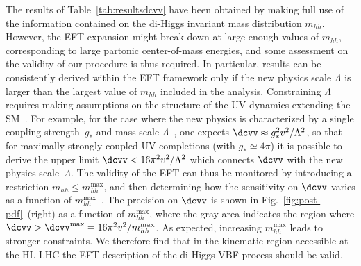 The results of Table~\ref{tab:resultsdcvv}
have been obtained by making full use of the information
contained on the di-Higgs invariant mass distribution $m_{hh}$.
%
However, the EFT expansion might break down at large enough values of
$m_{hh}$, corresponding to large partonic center-of-mass energies,
and some assessment on the validity of our procedure is thus required.
%
In particular, results can be consistently derived within the EFT
framework only if the new physics scale $\Lambda$ is larger than the largest value of $m_{hh}$ included in the analysis.
%
Constraining $\Lambda$
requires making assumptions on the structure of the UV dynamics extending the SM~\cite{Contino:2016jqw}.
%
For example, for the case where the new physics is characterized by a single 
coupling strength~$g_*$ and mass scale $\Lambda$~\cite{Giudice:2007fh}, one expects $
\dcvv \approx g_*^2 v^2/\Lambda^2$, so that
for maximally strongly-coupled UV completions (with $g_* \simeq 4\pi$)
it is possible to derive the upper limit
$\dcvv<16\pi^2 v^2/\Lambda^2$
which connects $\dcvv$ with the new physics scale~$\Lambda$.
%
The validity of the EFT can thus be monitored
by introducing a restriction $m_{hh} \leq  m_{hh}^\text{max}$, and
then determining how the sensitivity on $\dcvv$ varies as a function of 
$m_{hh}^\text{max}$~\cite{Contino:2016jqw}.
%
The precision on ${\dcvv}$
is shown in Fig.~\ref{fig:post-pdf}~(right) as a function of  $m_{hh}^{\max}$,
where the gray area indicates the region where $\dcvv > \dcvv^\text{max}=16\pi^2v^2/m_{hh}^\text{max}$.
%
As expected, increasing $m_{hh}^\text{max}$
leads to stronger constraints.
%
We therefore find that in the kinematic region accessible at the HL-LHC the
EFT description of the di-Higgs VBF process should be valid.
